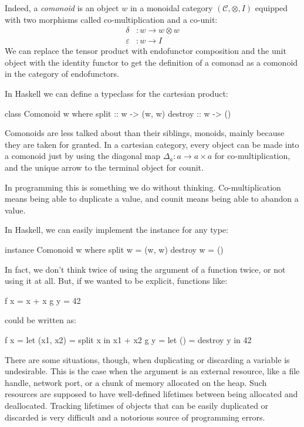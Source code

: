 \documentclass[DaoFP]{subfiles}
\begin{document}
Indeed, a \emph{comonoid} is an object $w$ in a monoidal category $(\mathcal{C}, \otimes, I)$ equipped with two morphisms called co-multiplication and a co-unit:
\begin{align*}
\delta &\colon w \to w \otimes w \\
\varepsilon &\colon w \to I
\end{align*}
We can replace the tensor product with endofunctor composition and the unit object with the identity functor to get the definition of a comonad as a comonoid in the category of endofunctors.

In Haskell we can define a  typeclass for the cartesian product:
\begin{haskell}
class Comonoid w where
  split   :: w -> (w, w)
  destroy :: w -> ()
\end{haskell}

Comonoids are less talked about than their siblings, monoids, mainly because they are taken for granted. In a cartesian category, every object can be made into a comonoid just by using the diagonal map $\Delta_a \colon a \to a \times a$ for co-multiplication, and the unique arrow to the terminal object for counit.

In programming this is something we do without thinking. Co-multiplication means being able to duplicate a value, and counit means being able to abandon a value. 

In Haskell, we can easily implement the  instance for any type:
\begin{haskell}
instance Comonoid w where
  split w   = (w, w)
  destroy w = ()
\end{haskell}
In fact, we don't think twice of using the argument of a function twice, or not using it at all. But, if we wanted to be explicit, functions like:
\begin{haskell}
f x = x + x
g y = 42
\end{haskell}
could be written as:
\begin{haskell}
f x = let (x1, x2) = split x 
      in x1 + x2
g y = let () = destroy y 
      in 42
\end{haskell}

There are some situations, though, when duplicating or discarding a variable is undesirable. This is the case when the argument is an external resource, like a file handle, network port, or a chunk of memory allocated on the heap. Such resources are supposed to have well-defined lifetimes between being allocated and deallocated. Tracking lifetimes of objects that can be easily duplicated or discarded is very difficult and a notorious source of programming errors.
\end{document}
